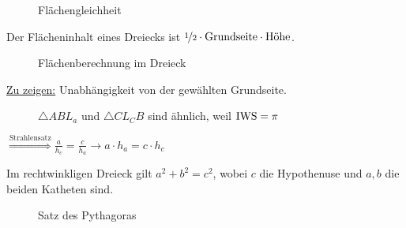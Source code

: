 \begin{figure}[ht]
    \centering
    \label{fig:flaechengleichheit}
    \caption{Flächengleichheit}
\end{figure}

Der Flächeninhalt eines Dreiecks ist $\nicefrac{1}{2} \cdot \text{Grundseite} \cdot \text{Höhe}$.

\begin{figure}[htp]
    \centering
    \caption{Flächenberechnung im Dreieck}
    \label{fig:flaechenberechnung-dreieck}
\end{figure}

\underline{Zu zeigen:} Unabhängigkeit von der gewählten Grundseite.

\begin{figure}[htp]
    \centering
    
    \caption{$\triangle ABL_a$ und $\triangle C{L_C}B$ sind ähnlich, weil $\operatorname{IWS} = \pi$}
    \label{fig:flaechenberechnung-dreieck-2}
\end{figure}

$\overset{\text{Strahlensatz}}{\Rightarrow} \frac{a}{h_c} = \frac{c}{h_a} \rightarrow a \cdot h_a = c \cdot h_c$

\begin{satz}
    Im rechtwinkligen Dreieck gilt $a^2 + b^2 = c^2$, wobei $c$ die
    Hypothenuse und $a, b$ die beiden Katheten sind.
\end{satz}

\begin{figure}[ht]
    \centering
    \subfloat[Beweisskizze]{
        
        \label{fig:pythagoras-2}
    }%
    \label{fig:pythagoras}
    \caption{Satz des Pythagoras}
\end{figure}


